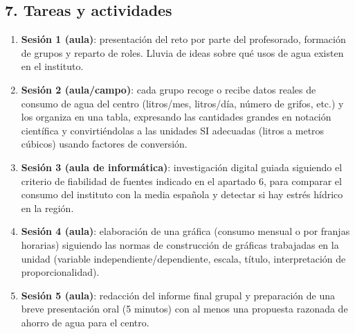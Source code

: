 \documentclass[11pt,a4paper]{article}
\begin{document}
\subsection*{7. Tareas y actividades}
\begin{enumerate}
    \item \textbf{Sesión 1 (aula)}: presentación del reto por parte del profesorado, formación de grupos y reparto de roles. Lluvia de ideas sobre qué usos de agua existen en el instituto.
    \item \textbf{Sesión 2 (aula/campo)}: cada grupo recoge o recibe datos reales de consumo de agua del centro (litros/mes, litros/día, número de grifos, etc.) y los organiza en una tabla, expresando las cantidades grandes en notación científica y convirtiéndolas a las unidades SI adecuadas (litros a metros cúbicos) usando factores de conversión.
    \item \textbf{Sesión 3 (aula de informática)}: investigación digital guiada siguiendo el criterio de fiabilidad de fuentes indicado en el apartado 6, para comparar el consumo del instituto con la media española y detectar si hay estrés hídrico en la región.
    \item \textbf{Sesión 4 (aula)}: elaboración de una gráfica (consumo mensual o por franjas horarias) siguiendo las normas de construcción de gráficas trabajadas en la unidad (variable independiente/dependiente, escala, título, interpretación de proporcionalidad).
    \item \textbf{Sesión 5 (aula)}: redacción del informe final grupal y preparación de una breve presentación oral (5 minutos) con al menos una propuesta razonada de ahorro de agua para el centro.
\end{enumerate}
\end{document}
